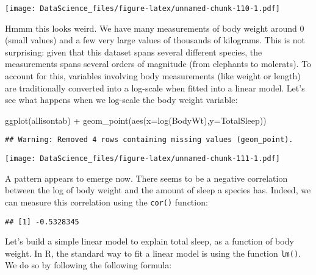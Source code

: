 \documentclass[
]{book}
\newenvironment{Shaded}{\begin{snugshade}}{\end{snugshade}}
\newcommand{\AttributeTok}[1]{\textcolor[rgb]{0.77,0.63,0.00}{#1}}
\newcommand{\FunctionTok}[1]{\textcolor[rgb]{0.00,0.00,0.00}{#1}}
\newcommand{\NormalTok}[1]{#1}
\newcommand{\SpecialCharTok}[1]{\textcolor[rgb]{0.00,0.00,0.00}{#1}}
\newcommand{\StringTok}[1]{\textcolor[rgb]{0.31,0.60,0.02}{#1}}
\begin{document}
\texttt{[image: DataScience\_files/figure-latex/unnamed-chunk-110-1.pdf]}

Hmmm this looks weird. We have many measurements of body weight around 0 (small values) and a few very large values of thousands of kilograms. This is not surprising: given that this dataset spans several different species, the measurements spans several orders of magnitude (from elephants to molerats). To account for this, variables involving body measurements (like weight or length) are traditionally converted into a log-scale when fitted into a linear model. Let's see what happens when we log-scale the body weight variable:

\begin{Shaded}
\begin{Highlighting}[]
\FunctionTok{ggplot}\NormalTok{(allisontab) }\SpecialCharTok{+} \FunctionTok{geom\_point}\NormalTok{(}\FunctionTok{aes}\NormalTok{(}\AttributeTok{x=}\FunctionTok{log}\NormalTok{(BodyWt),}\AttributeTok{y=}\NormalTok{TotalSleep))}
\end{Highlighting}
\end{Shaded}

\begin{verbatim}
## Warning: Removed 4 rows containing missing values (geom_point).
\end{verbatim}

\texttt{[image: DataScience\_files/figure-latex/unnamed-chunk-111-1.pdf]}

A pattern appears to emerge now. There seems to be a negative correlation between the log of body weight and the amount of sleep a species has. Indeed, we can measure this correlation using the \texttt{cor()} function:

\begin{Shaded}
\end{Shaded}

\begin{verbatim}
## [1] -0.5328345
\end{verbatim}

Let's build a simple linear model to explain total sleep, as a function of body weight. In R, the standard way to fit a linear model is using the function \texttt{lm()}. We do so by following the following formula:
\end{document}
